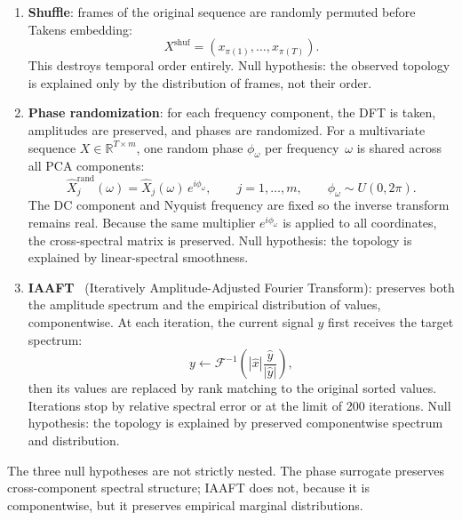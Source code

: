 \begin{enumerate}
    \item \textbf{Shuffle}: frames of the original sequence are randomly permuted before Takens embedding:
    \begin{equation}\label{eq:shuffle}
    X^{\text{shuf}}=(x_{\pi(1)},\ldots,x_{\pi(T)}).
    \end{equation}
    This destroys temporal order entirely. Null hypothesis: the observed topology is explained only by the distribution of frames, not their order.

    \item \textbf{Phase randomization}: for each frequency component, the DFT is taken, amplitudes are preserved, and phases are randomized. For a multivariate sequence $X\in\mathbb{R}^{T\times m}$, one random phase $\phi_\omega$ per frequency~$\omega$ is shared across all PCA components:
    \begin{equation}\label{eq:phase}
    \widehat{X}^{\text{rand}}_j(\omega)
    =
    \widehat{X}_j(\omega)\,e^{i\phi_\omega},
    \qquad j=1,\ldots,m,
    \qquad
    \phi_\omega\sim U(0,2\pi).
    \end{equation}
    The DC component and Nyquist frequency are fixed so the inverse transform remains real. Because the same multiplier $e^{i\phi_\omega}$ is applied to all coordinates, the cross-spectral matrix is preserved. Null hypothesis: the topology is explained by linear-spectral smoothness.

    \item \textbf{IAAFT}~\cite{schreiber1996improved} (Iteratively Amplitude-Adjusted Fourier Transform): preserves both the amplitude spectrum and the empirical distribution of values, componentwise. At each iteration, the current signal $y$ first receives the target spectrum:
    \begin{equation}\label{eq:iaaft}
    y \leftarrow \mathcal{F}^{-1}\!\left(|\widehat{x}|\frac{\widehat{y}}{|\widehat{y}|}\right),
    \end{equation}
    then its values are replaced by rank matching to the original sorted values. Iterations stop by relative spectral error or at the limit of 200 iterations. Null hypothesis: the topology is explained by preserved componentwise spectrum and distribution.
\end{enumerate}

The three null hypotheses are not strictly nested. The phase surrogate preserves cross-component spectral structure; IAAFT does not, because it is componentwise, but it preserves empirical marginal distributions.


